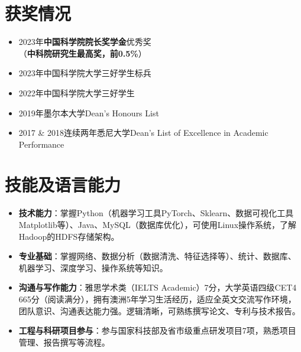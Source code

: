 \documentclass[UTF8,letterpaper,11pt]{article}
\begin{document}

\section{\textbf{获奖情况}}
\vspace{-5mm}
\begin{multicols}{2}
\begin{itemize}
  \setlength\itemsep{2.0pt}
  \item 2023年\textbf{中国科学院院长奖学金}优秀奖\\（\textbf{中科院研究生最高奖，前0.5\%}）
  \item 2023年中国科学院大学三好学生标兵
  \item 2022年中国科学院大学三好学生
  \item 2019年墨尔本大学Dean's Honours List
  \item 2017 \& 2018连续两年悉尼大学Dean's List of Excellence in Academic Performance
\end{itemize}
\end{multicols}




\section{\textbf{技能及语言能力}}

\begin{itemize}
  \setlength\itemsep{2.0pt}
  \item \textbf{技术能力}：掌握Python（机器学习工具PyTorch、Sklearn、数据可视化工具Matplotlib等）、Java、MySQL（数据库优化），可使用Linux操作系统，了解Hadoop的HDFS存储架构。
  \item \textbf{专业基础}：掌握网络、数据分析（数据清洗、特征选择等）、统计、数据库、机器学习、深度学习、操作系统等知识。
  \item \textbf{沟通与写作能力}：雅思学术类（IELTS Academic）7分，大学英语四级CET4 665分（阅读满分），拥有澳洲5年学习生活经历，适应全英文交流写作环境，团队意识、沟通表达能力强。逻辑清晰，可熟练撰写论文、专利与技术报告。
  \item \textbf{工程与科研项目参与}：参与国家科技部及省市级重点研发项目7项，熟悉项目管理、报告撰写等流程。
\end{itemize}


\end{document}
